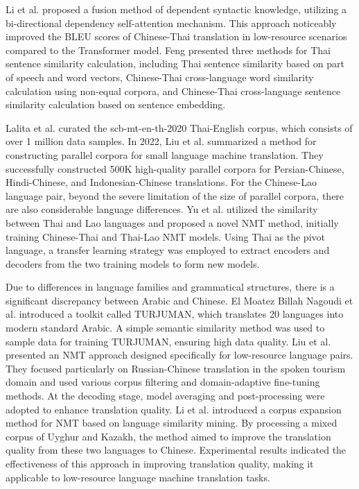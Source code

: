 \documentclass[acmsmall]{acmart}
\begin{document}
Li et al. \cite{4-2-30} proposed a fusion method of dependent syntactic knowledge, utilizing a bi-directional dependency self-attention mechanism. This approach noticeably improved the BLEU scores of Chinese-Thai translation in low-resource scenarios compared to the Transformer model. Feng \cite{4-2-31} presented three methods for Thai sentence similarity calculation, including Thai sentence similarity based on part of speech and word vectors, Chinese-Thai cross-language word similarity calculation using non-equal corpora, and Chinese-Thai cross-language sentence similarity calculation based on sentence embedding.

Lalita et al. \cite{thai-corpus} curated the scb-mt-en-th-2020 Thai-English corpus, which consists of over 1 million data samples. In 2022, Liu et al. \cite{4-2-32} summarized a method for constructing parallel corpora for small language machine translation. They successfully constructed 500K high-quality parallel corpora for Persian-Chinese, Hindi-Chinese, and Indonesian-Chinese translations. For the Chinese-Lao language pair, beyond the severe limitation of the size of parallel corpora, there are also considerable language differences. Yu et al. \cite{4-2-33} utilized the similarity between Thai and Lao languages and proposed a novel NMT method, initially training Chinese-Thai and Thai-Lao NMT models. Using Thai as the pivot language, a transfer learning strategy was employed to extract encoders and decoders from the two training models to form new models.

Due to differences in language families and grammatical structures, there is a significant discrepancy between Arabic and Chinese. El Moatez Billah Nagoudi et al. \cite{4-2-34} introduced a toolkit called TURJUMAN, which translates 20 languages into modern standard Arabic. A simple semantic similarity method was used to sample data for training TURJUMAN, ensuring high data quality. Liu et al. \cite{4-2-36} presented an NMT approach designed specifically for low-resource language pairs. They focused particularly on Russian-Chinese translation in the spoken tourism domain and used various corpus filtering and domain-adaptive fine-tuning methods. At the decoding stage, model averaging and post-processing were adopted to enhance translation quality. Li et al. \cite{4-2-37} introduced a corpus expansion method for NMT based on language similarity mining. By processing a mixed corpus of Uyghur and Kazakh, the method aimed to improve the translation quality from these two languages to Chinese. Experimental results indicated the effectiveness of this approach in improving translation quality, making it applicable to low-resource language machine translation tasks.
\end{document}
